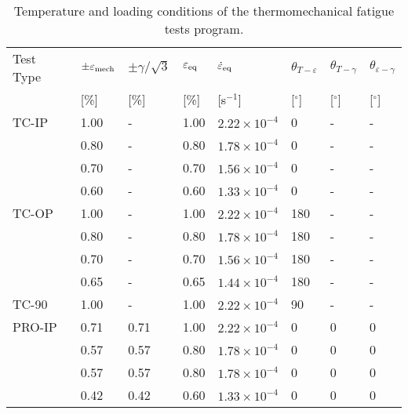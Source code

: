 
\begin{table}[htbp]
  \centering
  \caption{Temperature and loading conditions of the thermomechanical fatigue tests program.}
    \begin{tabular}{p{2cm}p{1.5cm}p{1.5cm}p{1.5cm}p{2.5cm}p{1cm}p{1cm}p{1cm}}
    \toprule
    Test Type & $\pm \varepsilon_{\rm{mech}}$ & $\pm \gamma/ \sqrt 3$ & $\varepsilon_{\rm{eq}}$ & $\dot \varepsilon_{\rm{eq}}$ & $\theta_{T-\varepsilon}$ & $\theta_{T-\gamma}$ & $\theta_{\varepsilon-\gamma}$ \\
          & [\%]  & [\%]  & [\%]  & [s$^{-1}$] & [$^\circ$] & [$^\circ$] & [$^\circ$] \\
    \midrule
    TC-IP & 1.00  & -     & 1.00  & $2.22\times 10^{-4}$ & 0     & -     & - \\
          & 0.80  & -     & 0.80  & $1.78\times 10^{-4}$ & 0     & -     & - \\
          & 0.70  & -     & 0.70  & $1.56\times 10^{-4}$ & 0     & -     & - \\
          & 0.60  & -     & 0.60  & $1.33\times 10^{-4}$ & 0     & -     & - \\
    \midrule
    TC-OP & 1.00  & -     & 1.00  & $2.22\times 10^{-4}$ & 180   & -     & - \\
          & 0.80  & -     & 0.80  & $1.78\times 10^{-4}$ & 180   & -     & - \\
          & 0.70  & -     & 0.70  & $1.56\times 10^{-4}$ & 180   & -     & - \\
          & 0.65  & -     & 0.65  & $1.44\times 10^{-4}$ & 180   & -     & - \\
    \midrule
    TC-90 & 1.00  & -     & 1.00  & $2.22\times 10^{-4}$ & 90    & -     & - \\
    \midrule
    PRO-IP & 0.71  & 0.71  & 1.00  & $2.22\times 10^{-4}$ & 0     & 0     & 0 \\
          & 0.57  & 0.57  & 0.80  & $1.78\times 10^{-4}$ & 0     & 0     & 0 \\
          & 0.57  & 0.57  & 0.80  & $1.78\times 10^{-4}$ & 0     & 0     & 0 \\
          & 0.42  & 0.42  & 0.60  & $1.33\times 10^{-4}$ & 0     & 0     & 0 \\
    \midrule

\end{tabular}
\end{table}
